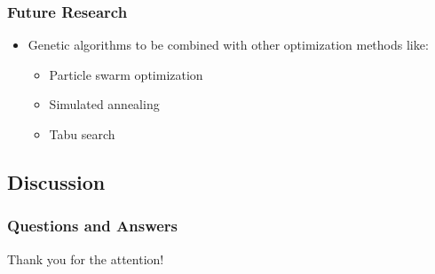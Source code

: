 \documentclass{beamer}
\begin{document}
\begin{frame}
\frametitle{Future Research}
\begin{itemize}
	\item Genetic algorithms to be combined with other optimization methods like:
	\begin{itemize}
		\item Particle swarm optimization
		\item Simulated annealing
		\item Tabu search
	\end{itemize}
\end{itemize}
\end{frame}

\subsection{Discussion}

\begin{frame}
\frametitle{Questions and Answers}
\center \huge{Thank you for the attention!}
\end{frame}
\end{document}
